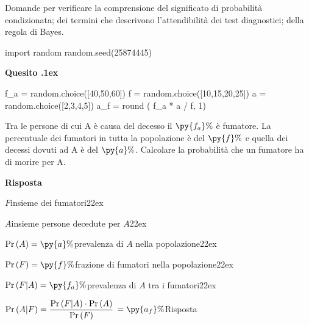 \documentclass[11pt,twoside,a4paper]{article}
\def\Pr{{\rm Pr\,}}
\newcounter{quesito}
\newenvironment{question}{\bigskip\addtocounter{quesito}{1}\par\textbf{Quesito \thequesito.\kern1ex}}{\vspace{\parskip}}
\newenvironment{answer}{\par\textbf{Risposta\quad}}{\vspace{\parskip}}
\begin{document}
Domande per verificare la comprensione del significato di probabilità condizionata; dei termini che descrivono l'attendibilità dei test diagnostici; della regola di Bayes.

\bigskip\bigskip

\begin{pycode}
import random
random.seed(25874445)
\end{pycode}


\begin{question}
\def\Pr{{\rm Pr\,}}
\begin{pycode}
f_a = random.choice([40,50,60])
f = random.choice([10,15,20,25])
a = random.choice([2,3,4,5])
a_f = round ( f_a * a / f, 1)
\end{pycode}
Tra le persone di cui A è causa del decesso il $\py{f_a}\%$ è fumatore. La percentuale dei fumatori in tutta la popolazione è del $\py{f}\%$ e quella dei decessi dovuti ad A è del $\py{a}\%$. Calcolare la probabilità che un fumatore ha di morire per A.
\begin{answer}

$F$\hfill insieme dei fumatori\kern22ex

$A$\hfill insieme persone decedute per $A$\kern22ex

$\Pr(A)=\py{a}\%$\hfill prevalenza di $A$ nella popolazione\kern22ex

$\Pr(F)=\py{f}\%$\hfill frazione di fumatori nella popolazione\kern22ex

$\Pr(F|A)=\py{f_a}\%$\hfill prevalenza di $A$ tra i fumatori\kern22ex

$\Pr(A|F)=\dfrac{\Pr(F|A)\cdot \Pr(A)}{\Pr(F)}$ {\color{blue}$=\py{a_f}\%$\hfill Risposta}
\end{answer}
\end{question}
\end{document}

